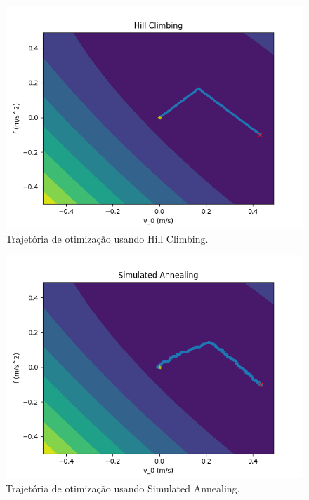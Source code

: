 \documentclass[conference]{IEEEtran}
\begin{document}
\begin{figure}[htbp]
\centering
\centerline{\includegraphics[scale=0.4]{hill_climbing.png}}
\caption{Trajetória de otimização usando Hill Climbing.}
\label{hill_climbing}
\end{figure} 

\begin{figure}[htbp]
\centering
\centerline{\includegraphics[scale=0.4]{simulated_annealing.png}}
\caption{Trajetória de otimização usando Simulated Annealing.}
\label{simulated_annealing}
\end{figure}
\end{document}
